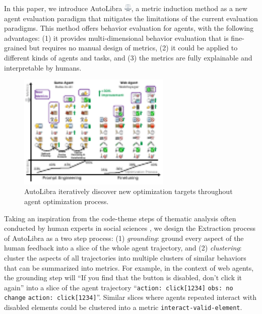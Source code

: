 In this paper, we introduce AutoLibra \protect\includegraphics[height=1em]{figs/scale.png},
a metric induction method as a new agent evaluation paradigm 
that mitigates the limitations of the current evaluation paradigms.
This method offers behavior evaluation for agents, with the following advantages:
(1) it provides multi-dimensional behavior evaluation that is fine-grained but requires no manual design of metrics,
(2) it could be applied to different kinds of agents and tasks, and 
(3) the metrics are fully explainable and interpretable by humans.

\begin{figure}
    \centering
    \includegraphics[width=0.65\textwidth]{figs/autolibra-teaser.pdf}
    \vspace{-10pt}
    \caption{AutoLibra iteratively discover new optimization targets throughout agent optimization process.}
    \label{fig:autolibra-training}
\end{figure}

Taking an inspiration from the code-theme steps of thematic analysis often conducted by human experts
in social sciences \citep{braun2006using},
we design the Extraction process of AutoLibra as a two step process:
(1) \emph{grounding}: ground every aspect of the human feedback into a slice of the whole agent trajectory,
and (2) \emph{clustering}: cluster the aspects of all trajectories into multiple clusters of similar behaviors
that can be summarized into metrics. For example, in the context of web agents, the grounding step will
``\textsf{If you find that the button is disabled, don't click it again}'' into a slice of the agent trajectory
``\texttt{action: click[1234]} \texttt{obs: no change} \texttt{action: click[1234]}''. Similar slices where 
agents repeated interact with disabled elements could be clustered into a metric \texttt{interact-valid-element}. 


